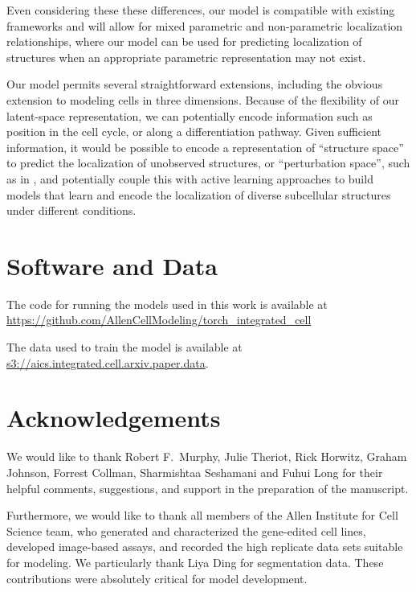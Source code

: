 \documentclass[accepted]{article}
\begin{document}
Even considering these these differences, our model is compatible with existing frameworks and will allow for mixed parametric and non-parametric localization relationships, where our model can be used for predicting localization of structures when an appropriate parametric representation may not exist.

Our model permits several straightforward extensions, including the obvious extension to modeling cells in three dimensions.
Because of the flexibility of our latent-space representation, we can potentially encode information such as position in the cell cycle, or along a differentiation pathway.
Given sufficient information, it would be possible to encode a representation of ``structure space'' to predict the localization of unobserved structures, or ``perturbation space'', such as in \cite{Paolini:2006be}, and potentially couple this with active learning approaches \cite{Naik:2016gw} to build models that learn and encode the localization of diverse subcellular structures under different conditions.


\section*{Software and Data}

The code for running the models used in this work is available at \url{https://github.com/AllenCellModeling/torch_integrated_cell}

The data used to train the model is available at \url{s3://aics.integrated.cell.arxiv.paper.data}.


\section*{Acknowledgements}

We would like to thank Robert F.\ Murphy, Julie Theriot, Rick Horwitz, Graham Johnson, Forrest Collman, Sharmishtaa Seshamani and Fuhui Long for their helpful comments, suggestions, and support in the preparation of the manuscript.

Furthermore, we would like to thank all members of the Allen Institute for Cell Science team, who generated and characterized the gene-edited cell lines, developed image-based assays, and recorded the high replicate data sets suitable for modeling. We particularly thank Liya Ding for segmentation data. These contributions were absolutely critical for model development.
\end{document}
